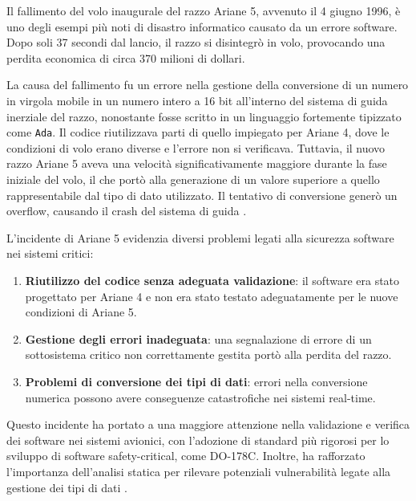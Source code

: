 Il fallimento del volo inaugurale del razzo Ariane 5, avvenuto il 4 giugno 1996, è uno degli esempi più noti di disastro informatico causato da un errore software. Dopo soli 37 secondi dal lancio, il razzo si disintegrò in volo, provocando una perdita economica di circa 370 milioni di dollari.

La causa del fallimento fu un errore nella gestione della conversione di un numero in virgola mobile in un numero intero a 16 bit all'interno del sistema di guida inerziale del razzo, nonostante fosse scritto in un linguaggio fortemente tipizzato come \texttt{Ada}.
Il codice riutilizzava parti di quello impiegato per Ariane 4, dove le condizioni di volo erano diverse e l'errore non si verificava. Tuttavia, il nuovo razzo Ariane 5 aveva una velocità significativamente maggiore durante la fase iniziale del volo, il che portò alla generazione di un valore superiore a quello rappresentabile dal tipo di dato utilizzato. Il tentativo di conversione generò un overflow, causando il crash del sistema di guida \cite{Lions1996}.

L'incidente di Ariane 5 evidenzia diversi problemi legati alla sicurezza software nei sistemi critici:
\begin{enumerate}
    \item \textbf{Riutilizzo del codice senza adeguata validazione}: il software era stato progettato per Ariane 4 e non era stato testato adeguatamente per le nuove condizioni di Ariane 5.
    \item \textbf{Gestione degli errori inadeguata}: una segnalazione di errore di un sottosistema critico non correttamente gestita portò alla perdita del razzo.
    \item \textbf{Problemi di conversione dei tipi di dati}: errori nella conversione numerica possono avere conseguenze catastrofiche nei sistemi real-time.
\end{enumerate}

Questo incidente ha portato a una maggiore attenzione nella validazione e verifica dei software nei sistemi avionici, con l'adozione di standard più rigorosi per lo sviluppo di software safety-critical, come DO-178C. Inoltre, ha rafforzato l'importanza dell'analisi statica per rilevare potenziali vulnerabilità legate alla gestione dei tipi di dati \cite{RTCA2011}.